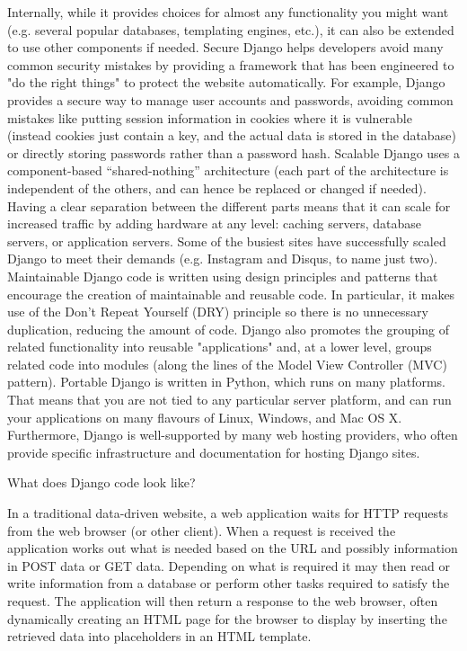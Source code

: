 	Internally, while it provides choices for almost any functionality you might want (e.g. several popular databases, templating 
	engines, etc.), it can also be extended to use other components if needed.
Secure
	Django helps developers avoid many common security mistakes by providing a framework that has been engineered to "do the right 
	things" to protect the website automatically. For example, Django provides a secure way to manage user accounts and passwords, 
	avoiding common mistakes like putting session information in cookies where it is vulnerable (instead cookies just contain a key, 
	and the actual data is stored in the database) or directly storing passwords rather than a password hash.
	Scalable
	Django uses a component-based “shared-nothing” architecture (each part of the architecture is independent of the others, 
	and can hence be replaced or changed if needed). Having a clear separation between the different parts means that it can 
	scale for increased traffic by adding hardware at any level: caching servers, database servers, or application servers. Some 
	of the busiest sites have successfully scaled Django to meet their demands (e.g. Instagram and Disqus, to name just two).
Maintainable
	Django code is written using design principles and patterns that encourage the creation of maintainable and reusable code. In 
	particular, it makes use of the Don't Repeat Yourself (DRY) principle so there is no unnecessary duplication, reducing the amount 
	of code. Django also promotes the grouping of related functionality into reusable "applications" and, at a lower level, groups 
	related code into modules (along the lines of the Model View Controller (MVC) pattern).
Portable
	Django is written in Python, which runs on many platforms. That means that you are not tied to any particular server platform, 
	and can run your applications on many flavours of Linux, Windows, and Mac OS X. Furthermore, Django is well-supported by many web 
	hosting providers, who often provide specific infrastructure and documentation for hosting Django sites.

What does Django code look like?

In a traditional data-driven website, a web application waits for HTTP requests from the web browser (or other client). When a request is received the application works out what is needed based on the URL and possibly information in POST data or GET data. Depending on what is required it may then read or write information from a database or perform other tasks required to satisfy the request. The application will then return a response to the web browser, often dynamically creating an HTML page for the browser to display by inserting the retrieved data into placeholders in an HTML template.
	
